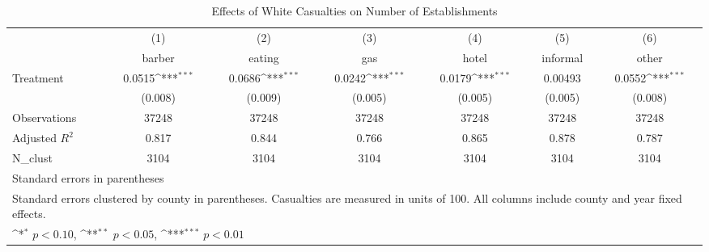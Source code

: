 \begin{table}[htbp]\centering
\def\sym#1{\ifmmode^{#1}\else\(^{#1}\)\fi}
\caption{Effects of White Casualties on Number of Establishments}
\begin{tabular}{l*{6}{c}}
\hline\hline
                    &\multicolumn{1}{c}{(1)}&\multicolumn{1}{c}{(2)}&\multicolumn{1}{c}{(3)}&\multicolumn{1}{c}{(4)}&\multicolumn{1}{c}{(5)}&\multicolumn{1}{c}{(6)}\\
                    &\multicolumn{1}{c}{barber}&\multicolumn{1}{c}{eating}&\multicolumn{1}{c}{gas}&\multicolumn{1}{c}{hotel}&\multicolumn{1}{c}{informal}&\multicolumn{1}{c}{other}\\
\hline
Treatment           &      0.0515\sym{***}&      0.0686\sym{***}&      0.0242\sym{***}&      0.0179\sym{***}&     0.00493         &      0.0552\sym{***}\\
                    &     (0.008)         &     (0.009)         &     (0.005)         &     (0.005)         &     (0.005)         &     (0.008)         \\
\hline
Observations        &       37248         &       37248         &       37248         &       37248         &       37248         &       37248         \\
Adjusted \(R^{2}\)  &       0.817         &       0.844         &       0.766         &       0.865         &       0.878         &       0.787         \\
N\_clust             &        3104         &        3104         &        3104         &        3104         &        3104         &        3104         \\
\hline\hline
\multicolumn{7}{l}{\footnotesize Standard errors in parentheses}\\
\multicolumn{7}{l}{\footnotesize Standard errors clustered by county in parentheses.         Casualties are measured in units of 100.          All columns include county and year fixed effects.}\\
\multicolumn{7}{l}{\footnotesize \sym{*} \(p<0.10\), \sym{**} \(p<0.05\), \sym{***} \(p<0.01\)}\\
\end{tabular}
\end{table}
